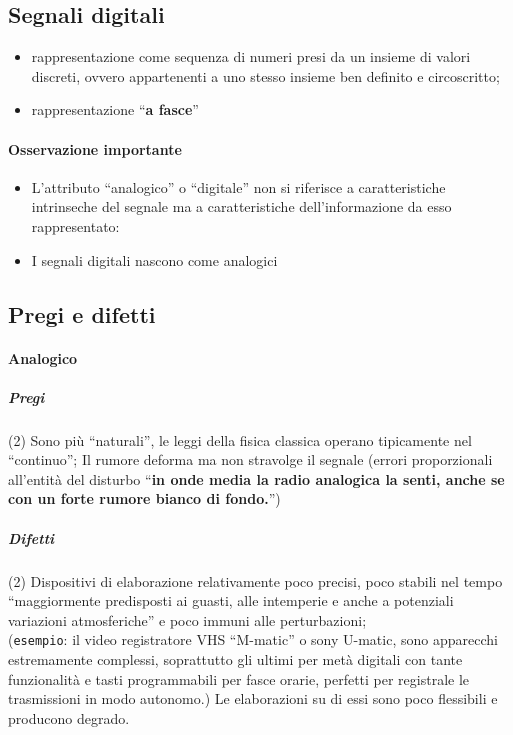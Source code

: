 \subsection{Segnali digitali\label{sdigital}}
\begin{itemize}
	\item rappresentazione come sequenza di numeri presi da un insieme di
		valori discreti, ovvero appartenenti a uno stesso insieme ben definito
		e circoscritto;
	\item rappresentazione ``{\bf a fasce}''
\end{itemize}
\paragraph{Osservazione importante}
\begin{itemize}
	\item L'attributo ``analogico'' o ``digitale'' non si riferisce a
		caratteristiche intrinseche del segnale ma a caratteristiche
		dell'informazione da esso rappresentato:
	\item {\color{red} I segnali digitali nascono come analogici}
\end{itemize}
\subsection{Pregi e difetti}
\paragraph{Analogico}
\subparagraph{Pregi}
\begin{tasks}(2)
	\task Sono più ``naturali'', le leggi della fisica classica operano
	tipicamente nel ``continuo'';
	\task Il rumore deforma ma non stravolge il segnale (errori proporzionali
	all'entità del disturbo ``{\bf in onde media la radio analogica la senti,
	anche se con un forte rumore bianco di fondo.}'')
\end{tasks}
\subparagraph{Difetti}
\begin{tasks}(2)
	\task Dispositivi di elaborazione relativamente poco precisi, poco stabili
	nel tempo ``maggiormente predisposti ai guasti, alle intemperie e anche a
	potenziali variazioni atmosferiche'' e poco immuni alle perturbazioni;\\
	({\tt esempio}: il video registratore VHS ``M-matic'' o sony U-matic, sono
	apparecchi estremamente complessi, soprattutto gli ultimi per metà digitali
	con tante funzionalità e tasti programmabili per fasce orarie, perfetti per
	registrale le trasmissioni in modo autonomo.)
	\task Le elaborazioni su di essi sono poco flessibili e producono degrado.
\end{tasks}

